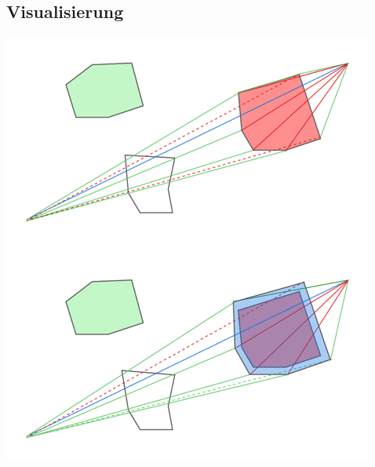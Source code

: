 \subsection*{Visualisierung}





\begin{center}
    \includegraphics[width=\columnwidth]{images/routing-algo}
    \label{fig:REPLACE}
\end{center}

